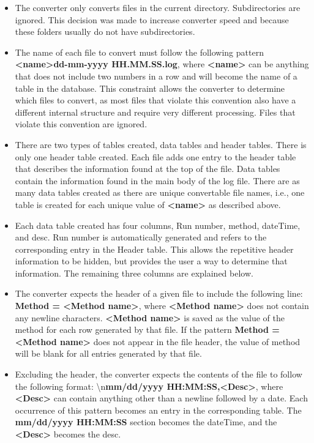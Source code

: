 \documentclass[letterpaper,11pt,twoside,final]{article}
\begin{document}
\begin{itemize}
  \item The converter only converts files in the current
directory. Subdirectories are ignored. This decision was made to
increase converter speed and because these folders usually
do not have subdirectories. 
  \item The name of each file to convert must follow the following pattern
    \textbf{<name>dd-mm-yyyy HH.MM.SS.log}, where \textbf{<name>} can be
    anything that does not include two numbers in a row and will
    become the name of a table in the database.
    This constraint allows the converter to determine which files to
    convert, as most files that violate this convention also have a
    different internal structure and require very different
    processing. Files that violate this convention are ignored.
  \item There are two types of tables created, data tables and header
    tables. There is only one header table created. Each file adds one
    entry to the header table that describes the information found at
    the top of the file. Data tables contain the information
    found in the main body of the log file. There are as many data
    tables created as there are unique convertable file names, i.e., one
    table is created for each unique value of \textbf{<name>} as
    described above.
    \item
    Each data table created has four columns, Run number, method, dateTime, and
    desc. Run number is automatically generated and refers to the
    corresponding entry in the Header table. This allows the
    repetitive header information to be hidden, but provides the user
    a way to determine that information. The remaining three columns
    are explained below.
  \item The converter expects the header of a given file to include
    the following line: \textbf{Method = <Method name>}, where
    \textbf{<Method name>} does not contain any newline characters. \textbf{<Method name>} is
    saved as the value of the method for each row generated by that
    file. If the pattern \textbf{Method = <Method name>} does not
    appear in the file header, the value of method will be blank for
    all entries generated by that file.
  \item Excluding the header, the converter expects the contents of
    the file to follow the following format: \textbackslash n\textbf{mm/dd/yyyy HH:MM:SS,<Desc>}, where \textbf{<Desc>} can
    contain anything other than a newline followed by a date. Each
    occurrence of this pattern becomes an entry in the corresponding
    table. The \textbf{mm/dd/yyyy HH:MM:SS} section becomes the dateTime, and
    the \textbf{<Desc>} becomes the desc.
\end{itemize}
\end{document}

